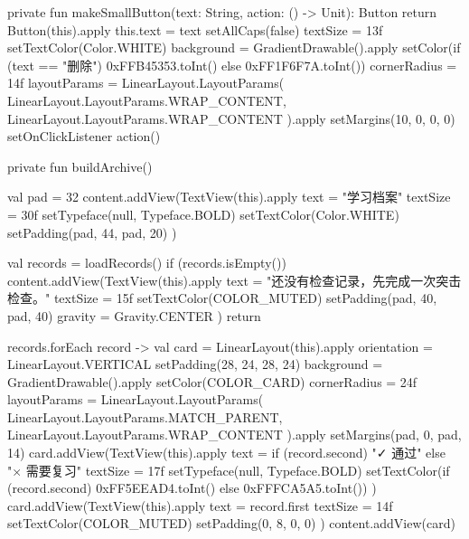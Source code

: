 {    private fun makeSmallButton(text: String, action: () -> Unit): Button {
        return Button(this).apply {
            this.text = text
            setAllCaps(false)
            textSize = 13f
            setTextColor(Color.WHITE)
            background = GradientDrawable().apply {
                setColor(if (text == "删除") 0xFFB45353.toInt() else 0xFF1F6F7A.toInt())
                cornerRadius = 14f
            }
            layoutParams = LinearLayout.LayoutParams(
                LinearLayout.LayoutParams.WRAP_CONTENT,
                LinearLayout.LayoutParams.WRAP_CONTENT
            ).apply { setMargins(10, 0, 0, 0) }
            setOnClickListener { action() }
        }
    }

    private fun buildArchive() {
        val pad = 32
        content.addView(TextView(this).apply {
            text = "学习档案"
            textSize = 30f
            setTypeface(null, Typeface.BOLD)
            setTextColor(Color.WHITE)
            setPadding(pad, 44, pad, 20)
        })

        val records = loadRecords()
        if (records.isEmpty()) {
            content.addView(TextView(this).apply {
                text = "还没有检查记录，先完成一次突击检查。"
                textSize = 15f
                setTextColor(COLOR_MUTED)
                setPadding(pad, 40, pad, 40)
                gravity = Gravity.CENTER
            })
            return
        }

        records.forEach { record ->
            val card = LinearLayout(this).apply {
                orientation = LinearLayout.VERTICAL
                setPadding(28, 24, 28, 24)
                background = GradientDrawable().apply {
                    setColor(COLOR_CARD)
                    cornerRadius = 24f
                }
                layoutParams = LinearLayout.LayoutParams(
                    LinearLayout.LayoutParams.MATCH_PARENT,
                    LinearLayout.LayoutParams.WRAP_CONTENT
                ).apply { setMargins(pad, 0, pad, 14) }
            }
            card.addView(TextView(this).apply {
                text = if (record.second) "✓ 通过" else "× 需要复习"
                textSize = 17f
                setTypeface(null, Typeface.BOLD)
                setTextColor(if (record.second) 0xFF5EEAD4.toInt() else 0xFFFCA5A5.toInt())
            })
            card.addView(TextView(this).apply {
                text = record.first
                textSize = 14f
                setTextColor(COLOR_MUTED)
                setPadding(0, 8, 0, 0)
            })
            content.addView(card)
        }
    }

}
